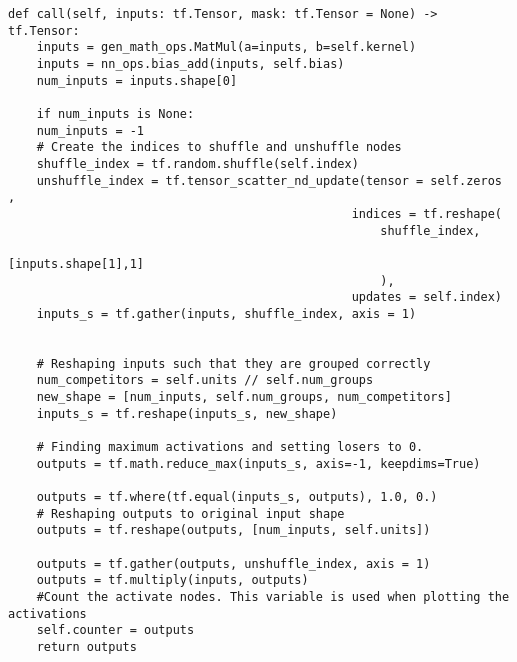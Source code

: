 \lstset{style=Python}
\begin{lstlisting}[caption={Python implementation for the custom activation function used to define the \ac{SCO} layer.},captionpos=b, label={lst:channel_out}]
def call(self, inputs: tf.Tensor, mask: tf.Tensor = None) -> tf.Tensor:
    inputs = gen_math_ops.MatMul(a=inputs, b=self.kernel)
    inputs = nn_ops.bias_add(inputs, self.bias)
    num_inputs = inputs.shape[0]

    if num_inputs is None:
    num_inputs = -1
    # Create the indices to shuffle and unshuffle nodes
    shuffle_index = tf.random.shuffle(self.index)
    unshuffle_index = tf.tensor_scatter_nd_update(tensor = self.zeros , 
                                                indices = tf.reshape(
                                                    shuffle_index, 
                                                    [inputs.shape[1],1]
                                                    ), 
                                                updates = self.index)
    inputs_s = tf.gather(inputs, shuffle_index, axis = 1)


    # Reshaping inputs such that they are grouped correctly
    num_competitors = self.units // self.num_groups
    new_shape = [num_inputs, self.num_groups, num_competitors]
    inputs_s = tf.reshape(inputs_s, new_shape)

    # Finding maximum activations and setting losers to 0.
    outputs = tf.math.reduce_max(inputs_s, axis=-1, keepdims=True)

    outputs = tf.where(tf.equal(inputs_s, outputs), 1.0, 0.)
    # Reshaping outputs to original input shape
    outputs = tf.reshape(outputs, [num_inputs, self.units])

    outputs = tf.gather(outputs, unshuffle_index, axis = 1) 
    outputs = tf.multiply(inputs, outputs)
    #Count the activate nodes. This variable is used when plotting the activations
    self.counter = outputs
    return outputs 
\end{lstlisting}
\newpage
\lstset{style=Python}
